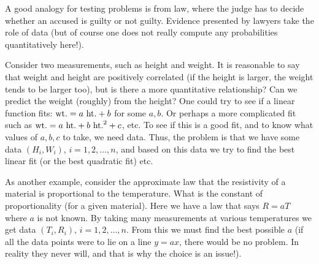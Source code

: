 \documentclass[preprint,  11pt]{amsart}
\renewcommand{\benu}{\begin{enumerate}\setlength\itemsep{6pt}}
\begin{document}
A good analogy for testing problems is from law, where the judge has to decide whether an accused is guilty or not guilty. Evidence presented by lawyers take the role of data (but of course one does not really compute any probabilities quantitatively here!).

 Consider two measurements, such as height and weight. It is reasonable to say that weight and height are positively correlated (if the height is larger, the weight tends to be larger too), but is there a more quantitative relationship? Can we predict the weight (roughly) from the height?  One could try to see if a linear function fits: $\mbox{wt.}=a\ \mbox{ht.}+b$ for some $a,b$. Or perhaps a more complicated fit such as $\mbox{wt.}=a\ \mbox{ht.}+b\ \mbox{ht.}^{2}+c$, etc. To see if this is a good fit, and to know what values of $a,b,c$ to take, we need data. Thus, the problem is that we have some data $(H_{i},W_{i})$, $i=1,2,\ldots ,n$, and based on this data we try to find the best linear fit (or the best quadratic fit) etc.

As another example, consider the approximate law that the resistivity of a  material is proportional to the temperature. What is the constant of proportionality (for a given material). Here we have a law that says $R=aT$ where $a$ is not known. By taking many measurements at various temperatures we get data $(T_{i},R_{i})$, $i=1,2,\ldots ,n$. From this we must find the best possible $a$ (if all the data points were to lie on a line $y=ax$, there would be no problem. In reality they never will, and that is why the choice is an issue!).



\end{document}
